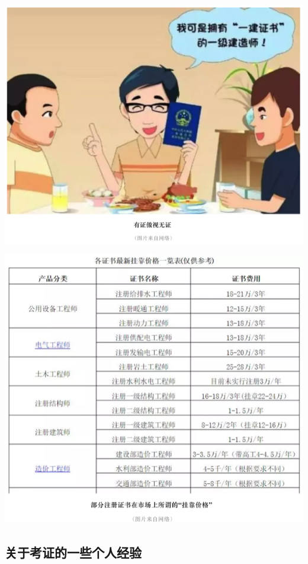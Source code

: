 \documentclass[]{book}
\begin{document}
\includegraphics[width=8.33in]{images/kaozheng2}

\includegraphics[width=8.33in]{images/kaozheng3}

\hypertarget{ux5173ux4e8eux8003ux8bc1ux7684ux4e00ux4e9bux4e2aux4ebaux7ecfux9a8c}{%
\subsection{关于考证的一些个人经验}\label{ux5173ux4e8eux8003ux8bc1ux7684ux4e00ux4e9bux4e2aux4ebaux7ecfux9a8c}}
\end{document}
